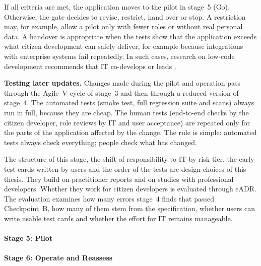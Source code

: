 \documentclass[10pt,a4paper]{article}
\begin{document}
If all criteria are met, the application moves to the pilot in stage~5 (Go).
Otherwise, the gate decides to revise, restrict, hand over or stop. A
restriction may, for example, allow a pilot only with fewer roles or without
real personal data. A handover is appropriate when the tests show that the
application exceeds what citizen development can safely deliver, for example
because integrations with enterprise systems fail repeatedly. In such cases,
research on low-code development recommends that IT co-develops or leads
\parencite{viljoen2024}.

\textbf{Testing later updates.} Changes made during the pilot and operation
pass through the Agile~V cycle of stage~3 and then through a reduced version of stage~4. The
automated tests (smoke test, full regression suite and scans) always run in
full, because they are cheap. The human tests (end-to-end checks by the
citizen developer, role reviews by IT and user acceptance) are repeated only
for the parts of the application affected by the change. The rule is simple:
automated tests always check everything; people check what has changed.

The structure of this stage, the shift of responsibility to IT by risk tier,
the early test cards written by users and the order of the tests are design
choices of this thesis. They build on practitioner reports and on studies with
professional developers. Whether they work for citizen developers is evaluated
through eADR. The evaluation examines how many errors stage~4 finds that passed
Checkpoint~B, how many of them stem from the specification, whether users can
write usable test cards and whether the effort for IT remains manageable.

\paragraph{Stage 5: Pilot}

\paragraph{Stage 6: Operate and Reassess}
\end{document}
